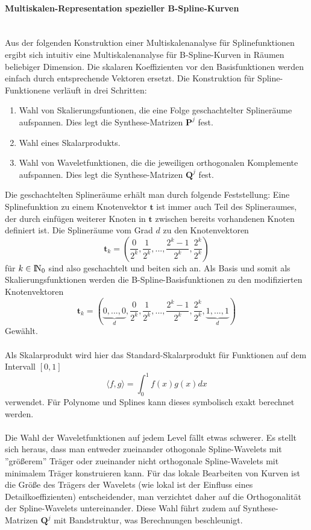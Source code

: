 \paragraph{Multiskalen-Representation spezieller B-Spline-Kurven}~\\
Aus der folgenden Konstruktion einer Multiskalenanalyse für Splinefunktionen ergibt sich intuitiv eine Multiskalenanalyse für B-Spline-Kurven in Räumen beliebiger Dimension. Die skalaren Koeffizienten vor den  Basisfunktionen werden einfach durch entsprechende Vektoren ersetzt. 
Die Konstruktion für Spline-Funktionene verläuft in drei Schritten: 
\begin{enumerate}
\item Wahl von Skalierungsfuntionen, die eine Folge geschachtelter Splineräume aufspannen. Dies legt die Synthese-Matrizen $\mathbf{P}^j$ fest. 
\item Wahl eines Skalarprodukts. 
\item Wahl von Waveletfunktionen, die die jeweiligen orthogonalen Komplemente aufspannen. Dies legt die Synthese-Matrizen $\mathbf{Q}^j$ fest.
\end{enumerate}
Die geschachtelten Splineräume erhält man durch folgende Feststellung: Eine Splinefunktion zu einem Knotenvektor $\mathbf{t}$ ist immer auch Teil des Splineraumes, der durch einfügen weiterer Knoten in $\mathbf{t}$ zwischen bereits vorhandenen Knoten definiert ist.
Die Splineräume vom Grad $d$ zu den Knotenvektoren
\[
\mathbf{t}_k=(\frac{0}{2^k},\frac{1}{2^k},...,\frac{2^k-1}{2^k},\frac{2^k}{2^k})
\]
für $k\in{\rm I\!N}_0$ sind also geschachtelt und beiten sich an. Als Basis und somit als Skalierungsfunktionen werden die B-Spline-Basisfunktionen zu den modifizierten Knotenvektoren
\[
\mathbf{t}_k=(\underbrace{0,...,0}_{d},\frac{0}{2^k},\frac{1}{2^k},...,\frac{2^k-1}{2^k},\frac{2^k}{2^k},\underbrace{1,...,1}_{d})
\]
Gewählt.\\
\\
Als Skalarprodukt wird hier das Standard-Skalarprodukt für Funktionen auf dem Intervall $[0,1]$
\[
\langle f,g\rangle =\int_0^1f(x)g(x)dx
\]
verwendet. Für Polynome und Splines kann dieses symbolisch exakt berechnet werden.\\
\\
Die Wahl der Waveletfunktionen auf jedem Level fällt etwas schwerer. Es stellt sich heraus, dass man entweder zueinander othogonale Spline-Wavelets mit ''größerem'' Träger oder zueinander nicht orthogonale Spline-Wavelets mit minimalem Träger konstruieren kann. Für das lokale Bearbeiten von Kurven ist die Größe des Trägers der Wavelets (wie lokal ist der Einfluss eines Detailkoeffizienten) entscheidender, man verzichtet daher auf die Orthogonalität der Spline-Wavelets untereinander. Diese Wahl führt zudem auf Synthese-Matrizen $\mathbf{Q}^j$ mit Bandstruktur, was Berechnungen beschleunigt.
